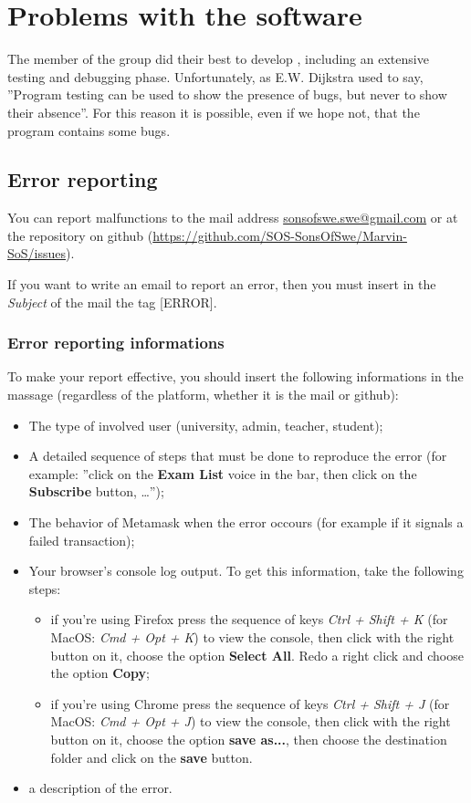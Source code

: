 \newpage
\section{Problems with the software}
The member of the \Group{} group did their best to develop \project{}, including an extensive testing and debugging phase. Unfortunately, as E.W. Dijkstra used to say, ''Program testing can be used to show the presence of bugs, but never to show their absence''. For this reason it is possible, even if we hope not, that the program contains some bugs.

\subsection{Error reporting}
You can report malfunctions to the mail address {\href{mailto:sonsofswe.swe@gmail.com}{sonsofswe.swe@gmail.com}} or at the \project{} repository on github (\url{https://github.com/SOS-SonsOfSwe/Marvin-SoS/issues}).

If you want to write an email to report an error, then you must insert in the \emph{Subject} of the mail the tag [ERROR]. 
\subsubsection{Error reporting informations}
To make your report effective, you should insert the following informations in the massage (regardless of the platform, whether it is the mail or github):
\begin{itemize}
	\item The type of  involved user (university, admin, teacher, student);
	\item A detailed sequence of steps that must be done to reproduce the error (for example: ''click on the \textbf{Exam List} voice in the bar, then click on the \textbf{Subscribe} button, 		\dots'');
	\item The behavior of Metamask when the error occours (for example if it signals a failed transaction);
	\item Your browser's console log output. To get this information, take the following steps: 
		\begin{itemize}
			\item 	if you're using Firefox press the sequence of keys \emph{Ctrl + Shift + K} (for MacOS: \emph{Cmd + Opt + K}) to view the console, then click with the right button on it, choose the option \textbf{Select All}. Redo a right click and  choose the option \textbf{Copy};
			\item 	if you're using Chrome press the sequence of keys \emph{Ctrl + Shift + J} {(for MacOS: \emph{Cmd + Opt + J})} to view the console, then click with the right button on it, choose the option \textbf{save as...}, then choose the destination folder and click on the \textbf{save} button. 
		\end{itemize}
	\item a description of the error.
\end{itemize}